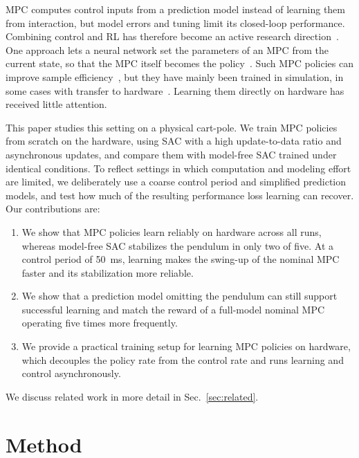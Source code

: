 \documentclass{l4dc2027}
\let\cite\citep
\begin{document}
\Ac{MPC} computes control inputs from a prediction model instead of learning
them from interaction, but model errors and tuning limit its closed-loop
performance. Combining control and \ac{RL} has therefore become an active
research direction~\cite{reiter2025synthesis,vernade2026foundations}. One
approach lets a neural network set the parameters of an \ac{MPC} from the
current state, so that the \ac{MPC} itself becomes the
policy~\cite{gros2020datadriven,zarrouki2021weights,reiter2023hierarchical}. Such
\ac{MPC} policies can improve sample
efficiency~\cite{fichtner2025thesis,romero2025acmpc}, but they have mainly been
trained in simulation, in some cases with transfer to
hardware~\cite{romero2024acmpc,romero2025acmpc}. Learning them directly on hardware has received
little attention.

This paper studies this setting on a physical cart-pole. We train \ac{MPC}
policies from scratch on the hardware, using \ac{SAC} with a high
update-to-data ratio and asynchronous updates, and compare them with
model-free \ac{SAC} trained under identical conditions. To reflect settings in
which computation and modeling effort are limited, we deliberately use a coarse
control period and simplified prediction models, and test how much of the
resulting performance loss learning can recover. Our contributions are:
\begin{enumerate}
  \item We show that \ac{MPC} policies learn reliably on
    hardware across all runs, whereas model-free \ac{SAC} stabilizes the
    pendulum in only two of five. At a
    control period of 50~ms, learning makes the swing-up of the nominal
    \ac{MPC} faster and its stabilization more reliable.
  \item We show that a prediction model omitting the pendulum can still
    support successful learning and match the reward of a full-model nominal
    \ac{MPC} operating five times more frequently.
  \item We provide a practical training setup for learning \ac{MPC} policies
    on hardware, which decouples the policy rate from the control rate and
    runs learning and control asynchronously.
\end{enumerate}
We discuss related work in more detail in Sec.~\ref{sec:related}.

\section{Method}
\label{sec:method}
\end{document}
